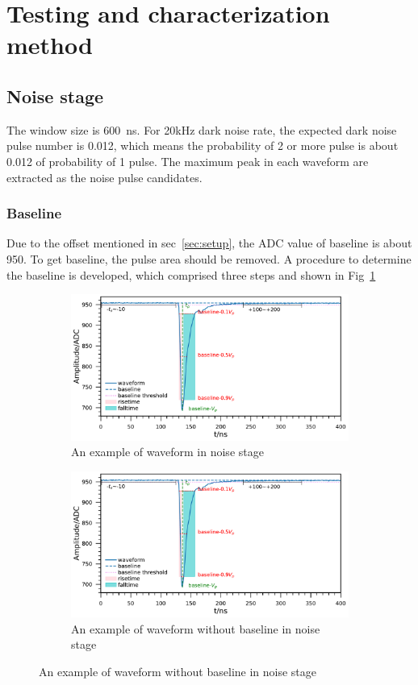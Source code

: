\section{Testing and characterization method}
\label{Method}

\subsection{Noise stage}
The window size is \SI{600}{ns}. For 20kHz dark noise rate, the expected dark noise pulse number is 0.012, which means the probability of 2 or more pulse is about 0.012 of probability of 1 pulse. The maximum peak in each waveform are extracted as the noise pulse candidates.
\subsubsection{Baseline}
Due to the offset mentioned in sec~\ref{sec:setup}, the ADC value of baseline is about 950. To get baseline, the pulse area should be removed. A procedure to determine the baseline is developed, which comprised three steps and shown in Fig~\ref{fig:baseline1}
\begin{figure}[!htbp]
    \centering
    \begin{subfigure}[b]{\textwidth}
        \includegraphics[width=\textwidth,page=1]{figures/result/noisebaseline697_219908_2.pdf}
        \caption{An example of waveform in noise stage}
        \label{fig:baseline1}
    \end{subfigure}
    \begin{subfigure}[b]{\textwidth}
        \includegraphics[width=\textwidth,page=3]{figures/result/noisebaseline697_219908_2.pdf}
        \caption{An example of waveform without baseline in noise stage}
        \label{fig:baseline2}
    \end{subfigure}
\end{figure}

